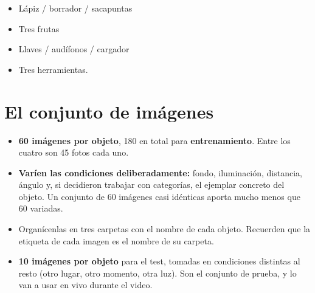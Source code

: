 \documentclass[11pt,a4paper]{article}
\begin{document}
\begin{tcolorbox}[colback=blue!4,colframe=blue!20,boxrule=0.6pt, coltitle=black, title=\textbf{Ejemplos de conjuntos de tres:}]
\begin{itemize}[label*=-]
	\item Lápiz / borrador / sacapuntas
	\item Tres frutas
	\item Llaves / audífonos / cargador
	\item Tres herramientas.
\end{itemize} 
\end{tcolorbox}

\vspace{1cm}

\section{El conjunto de imágenes}

\begin{itemize}
  \item \textbf{60 imágenes por objeto}, 180 en total para \textbf{entrenamiento}. Entre los cuatro son 45 fotos cada uno.
  \item \textbf{Varíen las condiciones deliberadamente:} fondo, iluminación, distancia, ángulo y,
        si decidieron trabajar con categorías, el ejemplar concreto del objeto. Un conjunto de 60
        imágenes casi idénticas aporta mucho menos que 60 variadas.
  \item Organícenlas en tres carpetas con el nombre de cada objeto. Recuerden que la etiqueta de
        cada imagen es el nombre de su carpeta.
  \item \textbf{10 imágenes por objeto} para el test, tomadas en condiciones
        distintas al resto (otro lugar, otro momento, otra luz). Son el conjunto de prueba, y lo van a usar en vivo durante el video.
\end{itemize}


\vspace{1cm}
\end{document}
